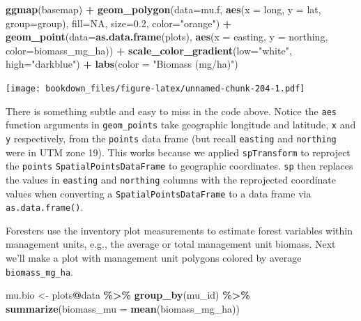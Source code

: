 \documentclass[
]{krantz}
\makeatletter
\newenvironment{Shaded}{\begin{snugshade}}{\end{snugshade}}
\newcommand{\DataTypeTok}[1]{\textcolor[rgb]{0.27,0.27,0.27}{#1}}
\newcommand{\FloatTok}[1]{\textcolor[rgb]{0.06,0.06,0.06}{#1}}
\newcommand{\KeywordTok}[1]{\textcolor[rgb]{0.27,0.27,0.27}{\textbf{#1}}}
\newcommand{\NormalTok}[1]{#1}
\newcommand{\OperatorTok}[1]{\textcolor[rgb]{0.43,0.43,0.43}{\textbf{#1}}}
\newcommand{\OtherTok}[1]{\textcolor[rgb]{0.37,0.37,0.37}{#1}}
\newcommand{\StringTok}[1]{\textcolor[rgb]{0.5,0.5,0.5}{#1}}
\newenvironment{kframe}{%
\medskip{}
\setlength{\fboxsep}{.8em}
 \def\at@end@of@kframe{}%
 \ifinner\ifhmode%
  \def\at@end@of@kframe{\end{minipage}}%
  \begin{minipage}{\columnwidth}%
 \fi\fi%
 \def\FrameCommand##1{\hskip\@totalleftmargin \hskip-\fboxsep
 \colorbox{shadecolor}{##1}\hskip-\fboxsep
     \hskip-\linewidth \hskip-\@totalleftmargin \hskip\columnwidth}%
 \MakeFramed {\advance\hsize-\width
   \@totalleftmargin\z@ \linewidth\hsize
   \@setminipage}}%
 {\par\unskip\endMakeFramed%
 \at@end@of@kframe}
\renewenvironment{Shaded}{\begin{kframe}}{\end{kframe}}
\makeatother
\begin{document}
\begin{Shaded}
\begin{Highlighting}[]
\KeywordTok{ggmap}\NormalTok{(basemap) }\OperatorTok{+}
\StringTok{    }\KeywordTok{geom\_polygon}\NormalTok{(}\DataTypeTok{data=}\NormalTok{mu.f, }\KeywordTok{aes}\NormalTok{(}\DataTypeTok{x =}\NormalTok{ long, }\DataTypeTok{y =}\NormalTok{ lat, }\DataTypeTok{group=}\NormalTok{group), }
                 \DataTypeTok{fill=}\OtherTok{NA}\NormalTok{, }\DataTypeTok{size=}\FloatTok{0.2}\NormalTok{, }\DataTypeTok{color=}\StringTok{"orange"}\NormalTok{) }\OperatorTok{+}
\StringTok{    }\KeywordTok{geom\_point}\NormalTok{(}\DataTypeTok{data=}\KeywordTok{as.data.frame}\NormalTok{(plots), }
               \KeywordTok{aes}\NormalTok{(}\DataTypeTok{x =}\NormalTok{ easting, }\DataTypeTok{y =}\NormalTok{ northing, }\DataTypeTok{color=}\NormalTok{biomass\_mg\_ha)) }\OperatorTok{+}\StringTok{ }
\StringTok{    }\KeywordTok{scale\_color\_gradient}\NormalTok{(}\DataTypeTok{low=}\StringTok{"white"}\NormalTok{, }\DataTypeTok{high=}\StringTok{"darkblue"}\NormalTok{) }\OperatorTok{+}
\StringTok{    }\KeywordTok{labs}\NormalTok{(}\DataTypeTok{color =} \StringTok{"Biomass (mg/ha)"}\NormalTok{)}
\end{Highlighting}
\end{Shaded}

\texttt{[image: bookdown\_files/figure-latex/unnamed-chunk-204-1.pdf]}

There is something subtle and easy to miss in the code above. Notice the \texttt{aes} function arguments in \texttt{geom\_points} take geographic longitude and latitude, \texttt{x} and \texttt{y} respectively, from the \texttt{points} data frame (but recall \texttt{easting} and \texttt{northing} were in UTM zone 19). This works because we applied \texttt{spTransform} to reproject the \texttt{points} \texttt{SpatialPointsDataFrame} to geographic coordinates. \texttt{sp} then replaces the values in \texttt{easting} and \texttt{northing} columns with the reprojected coordinate values when converting a \texttt{SpatialPointsDataFrame} to a data frame via \texttt{as.data.frame()}.

Foresters use the inventory plot measurements to estimate forest variables within management units, e.g., the average or total management unit biomass. Next we'll make a plot with management unit polygons colored by average \texttt{biomass\_mg\_ha}.

\begin{Shaded}
\begin{Highlighting}[]
\NormalTok{mu.bio \textless{}{-}}\StringTok{ }\NormalTok{plots}\OperatorTok{@}\NormalTok{data }\OperatorTok{\%\textgreater{}\%}\StringTok{ }\KeywordTok{group\_by}\NormalTok{(mu\_id) }\OperatorTok{\%\textgreater{}\%}\StringTok{ }
\StringTok{    }\KeywordTok{summarize}\NormalTok{(}\DataTypeTok{biomass\_mu =} \KeywordTok{mean}\NormalTok{(biomass\_mg\_ha))}
\end{Highlighting}
\end{Shaded}
\end{document}
